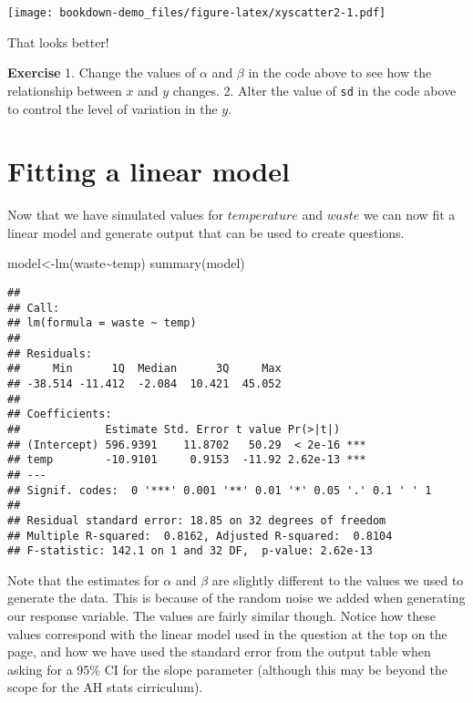 \documentclass[
]{book}
\newenvironment{Shaded}{\begin{snugshade}}{\end{snugshade}}
\newcommand{\FunctionTok}[1]{\textcolor[rgb]{0.00,0.00,0.00}{#1}}
\newcommand{\NormalTok}[1]{#1}
\newcommand{\OtherTok}[1]{\textcolor[rgb]{0.56,0.35,0.01}{#1}}
\newcommand{\SpecialCharTok}[1]{\textcolor[rgb]{0.00,0.00,0.00}{#1}}
\begin{document}
\texttt{[image: bookdown-demo\_files/figure-latex/xyscatter2-1.pdf]}

That looks better!

\textbf{Exercise}
1. Change the values of \(\alpha\) and \(\beta\) in the code above to see how the relationship between \(x\) and \(y\) changes.
2. Alter the value of \texttt{sd} in the code above to control the level of variation in the \(y\).

\hypertarget{fitting-a-linear-model}{%
\section{Fitting a linear model}\label{fitting-a-linear-model}}

Now that we have simulated values for \(temperature\) and \(waste\) we can now fit a linear model and generate output that can be used to create questions.

\begin{Shaded}
\begin{Highlighting}[]
\NormalTok{model}\OtherTok{\textless{}{-}}\FunctionTok{lm}\NormalTok{(waste}\SpecialCharTok{\textasciitilde{}}\NormalTok{temp)}
\FunctionTok{summary}\NormalTok{(model)}
\end{Highlighting}
\end{Shaded}

\begin{verbatim}
## 
## Call:
## lm(formula = waste ~ temp)
## 
## Residuals:
##     Min      1Q  Median      3Q     Max 
## -38.514 -11.412  -2.084  10.421  45.052 
## 
## Coefficients:
##             Estimate Std. Error t value Pr(>|t|)    
## (Intercept) 596.9391    11.8702   50.29  < 2e-16 ***
## temp        -10.9101     0.9153  -11.92 2.62e-13 ***
## ---
## Signif. codes:  0 '***' 0.001 '**' 0.01 '*' 0.05 '.' 0.1 ' ' 1
## 
## Residual standard error: 18.85 on 32 degrees of freedom
## Multiple R-squared:  0.8162, Adjusted R-squared:  0.8104 
## F-statistic: 142.1 on 1 and 32 DF,  p-value: 2.62e-13
\end{verbatim}

Note that the estimates for \(\alpha\) and \(\beta\) are slightly different to the values we used to generate the data. This is because of the random noise we added when generating our response variable. The values are fairly similar though. Notice how these values correspond with the linear model used in the question at the top on the page, and how we have used the standard error from the output table when asking for a 95\% CI for the slope parameter (although this may be beyond the scope for the AH stats cirriculum).
\end{document}
